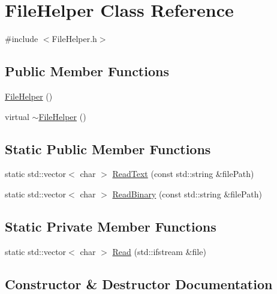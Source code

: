 \hypertarget{class_file_helper}{}\section{File\+Helper Class Reference}
\label{class_file_helper}


{\ttfamily \#include $<$File\+Helper.\+h$>$}

\subsection*{Public Member Functions}
\begin{DoxyCompactItemize}
\item 
\hyperlink{class_file_helper_aeb70acd6faa4d5ca838e6af25acf1841}{File\+Helper} ()
\item 
virtual \hyperlink{class_file_helper_afcc083ceafe656253e7698d86809e08e}{$\sim$\+File\+Helper} ()
\end{DoxyCompactItemize}
\subsection*{Static Public Member Functions}
\begin{DoxyCompactItemize}
\item 
static std\+::vector$<$ char $>$ \hyperlink{class_file_helper_ae30d0ce6ab8d931a39d00568c8e96963}{Read\+Text} (const std\+::string \&file\+Path)
\item 
static std\+::vector$<$ char $>$ \hyperlink{class_file_helper_a7357684123d99f88563e68fc24448963}{Read\+Binary} (const std\+::string \&file\+Path)
\end{DoxyCompactItemize}
\subsection*{Static Private Member Functions}
\begin{DoxyCompactItemize}
\item 
static std\+::vector$<$ char $>$ \hyperlink{class_file_helper_a7406bea168b0b6b887eef6874e432d3c}{Read} (std\+::ifstream \&file)
\end{DoxyCompactItemize}


\subsection{Constructor \& Destructor Documentation}
\mbox{\label{class_file_helper_aeb70acd6faa4d5ca838e6af25acf1841}} 
